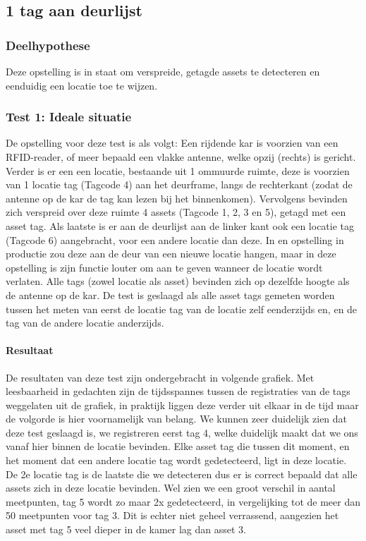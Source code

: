 \subsection{1 tag aan deurlijst}
\subsubsection{Deelhypothese}
Deze opstelling is in staat om verspreide, getagde assets te detecteren en eenduidig een locatie toe te wijzen.

\subsubsection{Test 1: Ideale situatie}
De opstelling voor deze test is als volgt: Een rijdende kar is voorzien van een RFID-reader, of meer bepaald een vlakke antenne, welke opzij (rechts) is gericht. Verder is er een een locatie, bestaande uit 1 ommuurde ruimte, deze is voorzien van 1 locatie tag (Tagcode 4) aan het deurframe, langs de rechterkant (zodat de antenne op de kar de tag kan lezen bij het binnenkomen). Vervolgens bevinden zich verspreid over deze ruimte 4 assets (Tagcode 1, 2, 3 en 5), getagd met een asset tag. Als laatste is er aan de deurlijst aan de linker kant ook een locatie tag (Tagcode 6) aangebracht, voor een andere locatie dan deze. In en opstelling in productie zou deze aan de deur van een nieuwe locatie hangen, maar in deze opstelling is zijn functie louter om aan te geven wanneer de locatie wordt verlaten. Alle tags (zowel locatie als asset) bevinden zich op dezelfde hoogte als de antenne op de kar. De test is geslaagd als alle asset tags gemeten worden tussen het meten van eerst de locatie tag van de locatie zelf eenderzijds en, en de tag van de andere locatie anderzijds.

\paragraph{Resultaat}
De resultaten van deze test zijn ondergebracht in volgende grafiek. Met leesbaarheid in gedachten zijn de tijdsspannes tussen de registraties van de tags weggelaten uit de grafiek, in praktijk liggen deze verder uit elkaar in de tijd maar de volgorde is hier voornamelijk van belang. We kunnen zeer duidelijk zien dat deze test geslaagd is, we registreren eerst tag 4, welke duidelijk maakt dat we ons vanaf hier binnen de locatie bevinden. Elke asset tag die tussen dit moment, en het moment dat een andere locatie tag wordt gedetecteerd, ligt in deze locatie. De 2e locatie tag is de laatste die we detecteren dus er is correct bepaald dat alle assets zich in deze locatie bevinden. Wel zien we een groot verschil in aantal meetpunten, tag 5 wordt zo maar 2x gedetecteerd, in vergelijking tot de meer dan 50 meetpunten voor tag 3. Dit is echter niet geheel verrassend, aangezien het asset met tag 5 veel dieper in de kamer lag dan asset 3.

